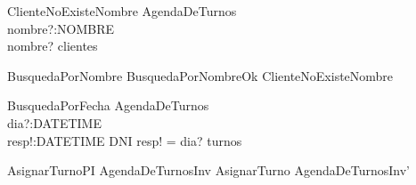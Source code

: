 \begin{schema}{ClienteNoExisteNombre}
\Xi AgendaDeTurnos \\
nombre?:NOMBRE \\
\where
nombre? \notin \ran clientes
\end{schema}

\begin{zed}
BusquedaPorNombre  BusquedaPorNombreOk \lor ClienteNoExisteNombre
\end{zed}

\begin{schema}{BusquedaPorFecha}
\Xi AgendaDeTurnos \\
dia?:\power DATETIME \\
resp!:DATETIME \pfun DNI
\where
resp! = dia? \dres turnos
\end{schema}

\begin{theorem}{AsignarTurnoPI}
AgendaDeTurnosInv \land AsignarTurno \implies AgendaDeTurnosInv'
\end{theorem}
